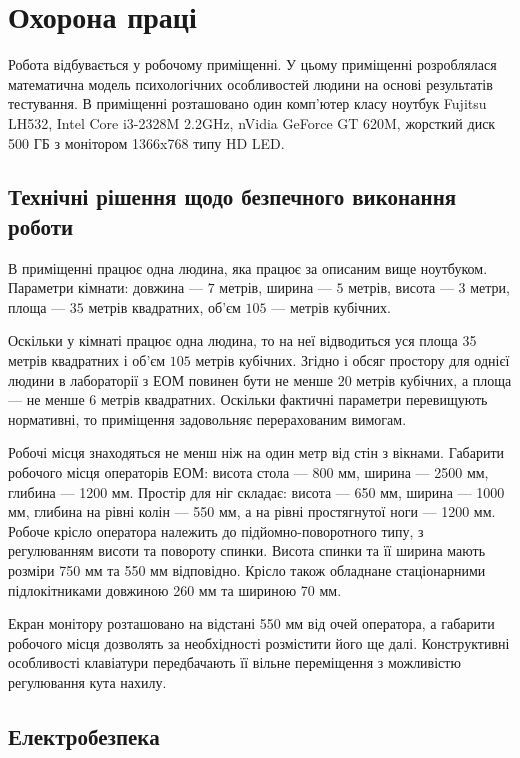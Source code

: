 \chapter{Охорона праці}

Робота відбувається у робочому приміщенні.
У цьому приміщенні розроблялася математична модель психологічних особливостей
людини на основі результатів тестування.
В приміщенні розташовано один комп’ютер класу ноутбук Fujitsu LH532,
Intel Core i3-2328M 2.2GHz, nVidia GeForce GT 620M,
жорсткий диск 500 ГБ з монітором 1366x768 типу HD LED.

\section{Технічні рішення щодо безпечного виконання роботи}

В приміщенні працює одна людина, яка працює за описаним вище ноутбуком.
Параметри кімнати:
довжина --- $7$ метрів, ширина --- $5$ метрів, висота --- $3$ метри,
площа --- $35$ метрів квадратних, об’єм $105$ --- метрів кубічних.

Оскільки у кімнаті працює одна людина, то на неї відводиться уся площа
35 метрів квадратних і об’єм $105$ метрів кубічних.
Згідно \cite{NPAOP} і \cite{DSanPiN} обсяг простору для однієї людини
в лабораторії з ЕОМ повинен бути не менше $20$ метрів кубічних,
а площа --- не менше $6$ метрів квадратних.
Оскільки фактичні параметри перевищують нормативні,
то приміщення задовольняє перерахованим вимогам.

Робочі місця знаходяться не менш ніж на один метр від стін з вікнами.
Габарити робочого місця операторів ЕОМ:
висота стола --- 800 мм, ширина --- 2500 мм, глибина --- 1200 мм.
Простір для ніг складає: висота --- 650 мм, ширина --- 1000 мм,
глибина на рівні колін --- 550 мм, а на рівні простягнутої ноги --- 1200 мм.
Робоче крісло оператора належить до підйомно-поворотного типу,
з регулюванням висоти та повороту спинки.
Висота спинки та її ширина мають розміри 750 мм та 550 мм відповідно.
Крісло також обладнане стаціонарними підлокітниками довжиною 260 мм
та шириною 70 мм.

Екран монітору розташовано на відстані 550 мм від очей оператора,
а габарити робочого місця дозволять за необхідності розмістити його ще далі.
Конструктивні особливості клавіатури передбачають її вільне переміщення
з можливістю регулювання кута нахилу.

\section{Електробезпека}

